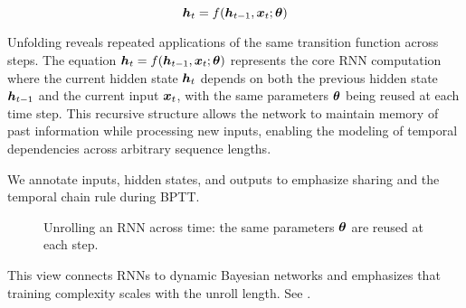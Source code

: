 \begin{equation}
\boldsymbol{h}_t = f(\boldsymbol{h}_{t-1}, \boldsymbol{x}_t; \boldsymbol{\theta})
\end{equation}

Unfolding reveals repeated applications of the same transition function across steps. The equation $\boldsymbol{h}_t = f(\boldsymbol{h}_{t-1}, \boldsymbol{x}_t; \boldsymbol{\theta})$ represents the core RNN computation where the current hidden state $\boldsymbol{h}_t$ depends on both the previous hidden state $\boldsymbol{h}_{t-1}$ and the current input $\boldsymbol{x}_t$, with the same parameters $\boldsymbol{\theta}$ being reused at each time step. This recursive structure allows the network to maintain memory of past information while processing new inputs, enabling the modeling of temporal dependencies across arbitrary sequence lengths.

We annotate inputs, hidden states, and outputs to emphasize sharing and the temporal chain rule during BPTT.
\begin{figure}[h]
    \centering
    \caption{Unrolling an RNN across time: the same parameters $\boldsymbol{\theta}$ are reused at each step.}
\end{figure}

This view connects RNNs to dynamic Bayesian networks and emphasizes that training complexity scales with the unroll length. See \cite{WebRNNWikipedia,GoodfellowEtAl2016,D2LChapterRNN}.

